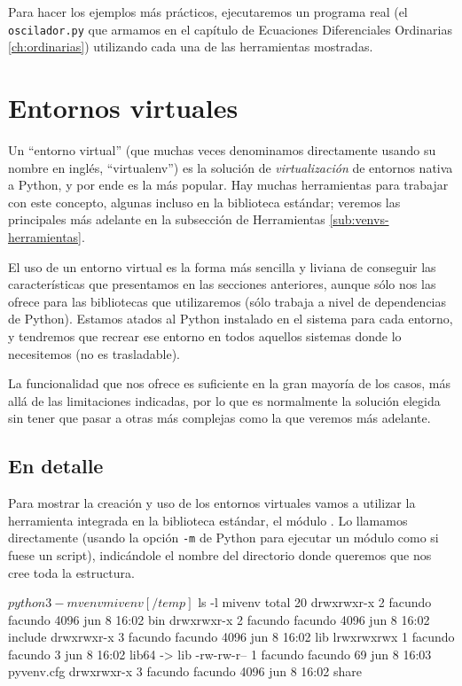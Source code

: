 Para hacer los ejemplos más prácticos, ejecutaremos un programa real (el \texttt{oscilador.py} que armamos en el capítulo de Ecuaciones Diferenciales Ordinarias \ref{ch:ordinarias}) utilizando cada una de las herramientas mostradas.


\section{Entornos virtuales} \label{sec:virtualenvs}

Un ``entorno virtual'' (que muchas veces denominamos directamente usando su nombre en inglés, ``virtualenv'') es la solución de \textit{virtualización} de entornos nativa a Python, y por ende es la más popular. Hay muchas herramientas para trabajar con este concepto, algunas incluso en la biblioteca estándar; veremos las principales más adelante en la subsección de Herramientas \ref{sub:venvs-herramientas}.

El uso de un entorno virtual es la forma más sencilla y liviana de conseguir las características que presentamos en las secciones anteriores, aunque sólo nos las ofrece para las bibliotecas que utilizaremos (sólo trabaja a nivel de dependencias de Python). Estamos atados al Python instalado en el sistema para cada entorno, y tendremos que recrear ese entorno en todos aquellos sistemas donde lo necesitemos (no es trasladable). 

La funcionalidad que nos ofrece es suficiente en la gran mayoría de los casos, más allá de las limitaciones indicadas, por lo que es normalmente la solución elegida sin tener que pasar a otras más complejas como la que veremos más adelante.


\subsection{En detalle}

Para mostrar la creación y uso de los entornos virtuales vamos a utilizar la herramienta integrada en la biblioteca estándar, el módulo . Lo llamamos directamente (usando la opción \verb|-m| de Python para ejecutar un módulo como si fuese un script), indicándole el nombre del directorio donde queremos que nos cree toda la estructura.

\begin{shell}
[/temp]$ python3 -m venv mivenv
[/temp]$ ls -l mivenv
total 20
drwxrwxr-x 2 facundo facundo 4096 jun  8 16:02 bin
drwxrwxr-x 2 facundo facundo 4096 jun  8 16:02 include
drwxrwxr-x 3 facundo facundo 4096 jun  8 16:02 lib
lrwxrwxrwx 1 facundo facundo    3 jun  8 16:02 lib64 -> lib
-rw-rw-r-- 1 facundo facundo   69 jun  8 16:03 pyvenv.cfg
drwxrwxr-x 3 facundo facundo 4096 jun  8 16:02 share
\end{shell}


